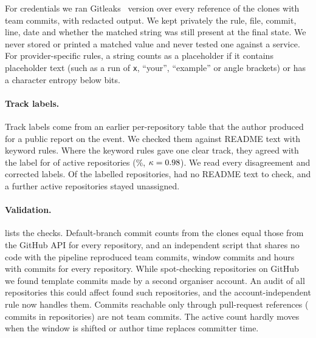 \documentclass{article}
\begin{document}
For credentials we ran Gitleaks~\cite{gitleaks2026} version \gitleaksversion{} over every reference of the \NRqFourScannedRepos{} clones with team commits, with redacted output. We kept privately the rule, file, commit, line, date and whether the matched string was still present at the final state. We never stored or printed a matched value and never tested one against a service. For provider-specific rules, a string counts as a placeholder if it contains placeholder text (such as a run of \texttt{x}, ``your'', ``example'' or angle brackets) or has a character entropy below \entropythr{} bits.

\paragraph{Track labels.}
Track labels come from an earlier per-repository table that the author produced for a public report on the event. We checked them against README text with keyword rules. Where the keyword rules gave one clear track, they agreed with the label for \NValidationTracksKwAgree{} of \NValidationTracksKwDecisive{} active repositories (\NValidationTracksKwAgreePct\%, $\kappa = \num{0.98}$). We read every disagreement and corrected \NRqOneLabelFixes{} labels. Of the labelled repositories, \NValidationTracksKwLabelledNoReadmeText{} had no README text to check, and a further \NRqOneTrackUnclear{} active repositories stayed unassigned.

\paragraph{Validation.}
 lists the checks. Default-branch commit counts from the clones equal those from the GitHub API for every repository, and an independent script that shares no code with the pipeline reproduced team commits, window commits and hours with commits for every repository. While spot-checking repositories on GitHub we found template commits made by a second organiser account. An audit of all \NValidationTemplateAuditN{} repositories this could affect found \NValidationTemplateFixes{} such repositories, and the account-independent rule now handles them. Commits reachable only through pull-request references (\NValidationPrOnlyCommits{} commits in \NValidationPrOnlyRepos{} repositories) are not team commits. The active count hardly moves when the window is shifted or author time replaces committer time.
\end{document}
